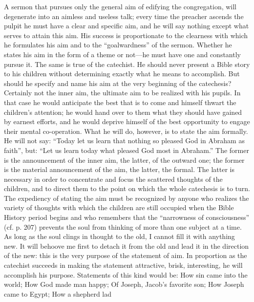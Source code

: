 A sermon that pursues only the general aim of edifying the congregation, will degenerate into an aimless and useless talk; every time the preacher ascends the pulpit he must have a clear and specific aim, and he will say nothing except what serves to attain this aim. His success is proportionate to the clearness with which he formulates his aim and to the “goalwardness” of the sermon. Whether he states his aim in the form of a theme or not—he must
have one and constantly pursue it. The same is true of the catechist. He should never present a Bible story to his children without determining exactly what he means to accomplish. But should he specify and name his aim at the very beginning of the catechesis? Certainly not the inner aim, the ultimate aim to be realized with his pupils. In that case he would anticipate the best that is to come and himself thwart the children’s attention; he would hand over to them what they should have gained by earnest efforts, and he would deprive himself of the best opportunity to engage their mental co-operation. What he will do, however, is to state the aim formally. He will not say: “Today let us learn that nothing so pleased God in Abraham as faith”, but: “Let us learn today what pleased God most in Abraham.” The former is the announcement of the inner aim, the latter, of the outward one; the former is the material announcement of the aim, the latter, the formal. The latter is necessary in order to concentrate and focus the scattered thoughts of the children, and to direct them to the point on which the whole catechesis is to turn. The expediency of stating the aim must be recognized by anyone who realizes the variety of thoughts with which the children are still occupied when the Bible History period begins and who remembers that the “narrowness of consciousness” (cf. p. 207) prevents the soul from thinking of more than one subject at a time. As long as the soul clings in thought to the old, I cannot fill it with anything new. It will behoove me first to detach it from the old and lead it in the direction of the new: this is the very purpose of the statement of aim. In proportion as the catechist succeeds in making the statement attractive, brisk, interesting, he will accomplish his purpose. Statements of this kind would be: How sin came into the world; How God made man happy; Of Joseph, Jacob’s favorite son; How Joseph came to Egypt; How a shepherd lad
